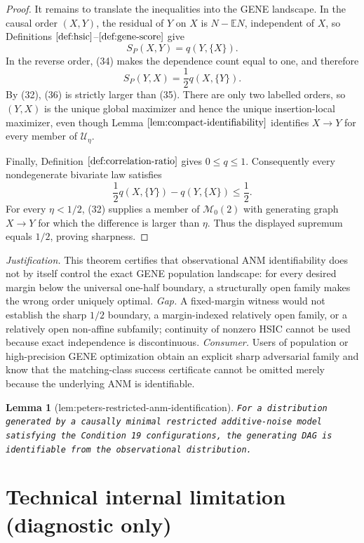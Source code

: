 \documentclass{article}
\newtheorem{lemma}{Lemma}
\begin{document}
\begin{proof}
It remains to translate the inequalities into the GENE landscape.  In the causal order \((X,Y)\), the residual of \(Y\) on \(X\) is \(N-\mathbb EN\), independent of \(X\), so Definitions \(\ref{def:hsic}\)--\(\ref{def:gene-score}\) give
\[
 S_P(X,Y)=q(Y,\{X\}). \tag{35}
\]
In the reverse order, (34) makes the dependence count equal to one, and therefore
\[
 S_P(Y,X)=\frac12q(X,\{Y\}). \tag{36}
\]
By (32), (36) is strictly larger than (35).  There are only two labelled orders, so \((Y,X)\) is the unique global maximizer and hence the unique insertion-local maximizer, even though Lemma \(\ref{lem:compact-identifiability}\) identifies \(X\to Y\) for every member of \(\mathcal U_\eta\).

Finally, Definition \(\ref{def:correlation-ratio}\) gives \(0\le q\le1\).  Consequently every nondegenerate bivariate law satisfies
\[
 \frac12q(X,\{Y\})-q(Y,\{X\})\le\frac12. \tag{37}
\]
For every \(\eta<1/2\), (32) supplies a member of \(\mathcal M_0(2)\) with generating graph \(X\to Y\) for which the difference is larger than \(\eta\).  Thus the displayed supremum equals \(1/2\), proving sharpness.
\end{proof}
\par\smallskip\noindent \textit{Justification.} This theorem certifies that observational ANM identifiability does not by itself control the exact GENE population landscape: for every desired margin below the universal one-half boundary, a structurally open family makes the wrong order uniquely optimal. \textit{Gap.} A fixed-margin witness would not establish the sharp \(1/2\) boundary, a margin-indexed relatively open family, or a relatively open non-affine subfamily; continuity of nonzero HSIC cannot be used because exact independence is discontinuous. \textit{Consumer.} Users of population or high-precision GENE optimization obtain an explicit sharp adversarial family and know that the matching-class success certificate cannot be omitted merely because the underlying ANM is identifiable.

\begin{lemma}[lem:peters-restricted-anm-identification]\label{lem:peters-restricted-anm-identification}
\texttt{For a distribution generated by a causally minimal restricted additive-\allowbreak{}noise model satisfying the Condition 19 configurations,\allowbreak{} the generating DAG is identifiable from the observational distribution.}
\end{lemma}

\section*{Technical internal limitation (diagnostic only)}
\end{document}
